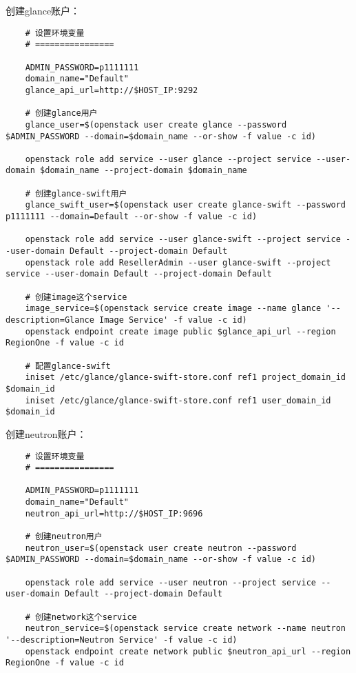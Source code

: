 \documentclass[a4paper,left=1.5cm,right=1.5cm,11pt]{article}
\begin{document}
	创建glance账户：
	\begin{lstlisting}
	# 设置环境变量
	# ================

	ADMIN_PASSWORD=p1111111
	domain_name="Default"
	glance_api_url=http://$HOST_IP:9292

	# 创建glance用户
	glance_user=$(openstack user create glance --password $ADMIN_PASSWORD --domain=$domain_name --or-show -f value -c id)
	
	openstack role add service --user glance --project service --user-domain $domain_name --project-domain $domain_name
	
	# 创建glance-swift用户
	glance_swift_user=$(openstack user create glance-swift --password p1111111 --domain=Default --or-show -f value -c id)
	
	openstack role add service --user glance-swift --project service --user-domain Default --project-domain Default
	openstack role add ResellerAdmin --user glance-swift --project service --user-domain Default --project-domain Default
	
	# 创建image这个service
	image_service=$(openstack service create image --name glance '--description=Glance Image Service' -f value -c id)
	openstack endpoint create image public $glance_api_url --region RegionOne -f value -c id

	# 配置glance-swift
	iniset /etc/glance/glance-swift-store.conf ref1 project_domain_id $domain_id
	iniset /etc/glance/glance-swift-store.conf ref1 user_domain_id $domain_id
	\end{lstlisting}

	创建neutron账户：
	\begin{lstlisting}
	# 设置环境变量
	# ================

	ADMIN_PASSWORD=p1111111
	domain_name="Default"
	neutron_api_url=http://$HOST_IP:9696

	# 创建neutron用户
	neutron_user=$(openstack user create neutron --password $ADMIN_PASSWORD --domain=$domain_name --or-show -f value -c id)

	openstack role add service --user neutron --project service --user-domain Default --project-domain Default

	# 创建network这个service
	neutron_service=$(openstack service create network --name neutron '--description=Neutron Service' -f value -c id)
	openstack endpoint create network public $neutron_api_url --region RegionOne -f value -c id
	\end{lstlisting}
\end{document}
